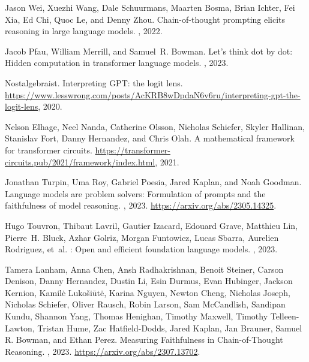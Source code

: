 \documentclass{article}
\begin{document}
\newpage
\begin{thebibliography}{12}

Jason Wei, Xuezhi Wang, Dale Schuurmans, Maarten Bosma, Brian Ichter, Fei Xia,
  Ed Chi, Quoc Le, and Denny Zhou.
\newblock Chain-of-thought prompting elicits reasoning in large language
  models.
, 2022.

Jacob Pfau, William Merrill, and Samuel~R. Bowman.
\newblock Let's think dot by dot: Hidden computation in transformer language
  models.
, 2023.

Nostalgebraist.
\newblock Interpreting {GPT}: the logit lens.
\newblock
  \url{https://www.lesswrong.com/posts/AcKRB8wDpdaN6v6ru/interpreting-gpt-the-logit-lens},
  2020.

Nelson Elhage, Neel Nanda, Catherine Olsson, Nicholas Schiefer, Skyler Hallinan,
  Stanislav Fort, Danny Hernandez, and Chris Olah.
\newblock A mathematical framework for transformer circuits.
\newblock
  \url{https://transformer-circuits.pub/2021/framework/index.html}, 2021.

Jonathan Turpin, Uma Roy, Gabriel Poesia, Jared Kaplan, and Noah Goodman.
\newblock Language models are problem solvers: Formulation of prompts and the
  faithfulness of model reasoning.
, 2023.
\newblock \url{https://arxiv.org/abs/2305.14325}.

Hugo Touvron, Thibaut Lavril, Gautier Izacard, Edouard Grave, Matthieu
  Lin, Pierre~H. Bluck, Azhar Golriz, Morgan Funtowicz, Lucas
  Sbarra, Aurelien Rodriguez, et~al.
: Open and efficient foundation language models.
, 2023.

Tamera Lanham, Anna Chen, Ansh Radhakrishnan, Benoit Steiner, Carson Denison, Danny Hernandez, Dustin Li, Esin Durmus, Evan Hubinger, Jackson Kernion, Kamilė Lukošiūtė, Karina Nguyen, Newton Cheng, Nicholas Joseph, Nicholas Schiefer, Oliver Rausch, Robin Larson, Sam McCandlish, Sandipan Kundu, Shannon Yang, Thomas Henighan, Timothy Maxwell, Timothy Telleen-Lawton, Tristan Hume, Zac Hatfield-Dodds, Jared Kaplan, Jan Brauner, Samuel R. Bowman, and Ethan Perez.
\newblock Measuring Faithfulness in Chain-of-Thought Reasoning.
, 2023.
\newblock \url{https://arxiv.org/abs/2307.13702}.


\end{thebibliography}
\end{document}
